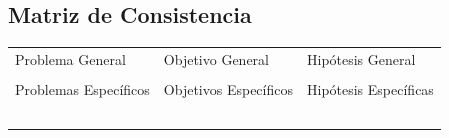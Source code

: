 \begin{appendices}
\chapter{Matriz de Consistencia}
\label{anexo3}
\begin{table}[h!]
	\centering
	\small
	\begin{tabular}{ |m{5cm}|m{5cm}|m{5cm}|  }
		\hline
		\rowcolor{bluejean}
		\Centering \color{white}{PROBLEMAS}& \Centering \color{white}{OBJETIVOS}& \Centering \color{white}{HIPÓTESIS}\\
		\hline
		\rowcolor{turq}
		\Centering Problema General& \Centering Objetivo General & \Centering Hipótesis General \\
		\hline
		{\ProblemaGeneral} & { \ObjetivoGeneral} & {\HipotesisGeneral} \\
		\hline
		\rowcolor{turq}
		\Centering Problemas Específicos& \Centering Objetivos Específicos & \Centering Hipótesis Específicas \\
		\hline
		{\Pbone} & {\Objone} & {\Hone} \\
		\hline
		{\Pbtwo} & {\Objtwo} & {\Htwo} \\
		\hline
		{\Pbthree} & {\Objthree} & {\Hthree} \\
		\hline
		{\Pbfour} & {\Objfour} & {\Hfour} \\
		\hline
		{\Pbfive} & {\Objfive} & {\Hfive} \\
		\hline
	\end{tabular}
\end{table}

\end{appendices} 